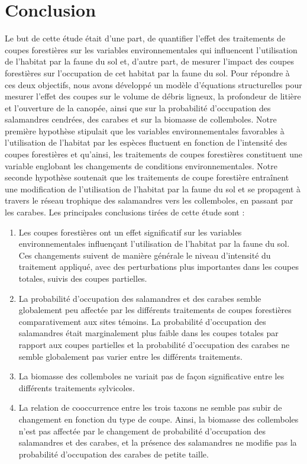 \chapter*{Conclusion}           %
\label{chap-conclusion}         %


Le but de cette étude était d'une part, de quantifier l'effet des traitements de coupes forestières sur les variables environnementales qui influencent 
l'utilisation de l'habitat par la faune du sol et, d'autre part, de mesurer l'impact des coupes forestières sur l'occupation de cet habitat par la faune du sol. 
Pour répondre à ces deux objectifs, nous avons développé un modèle d'équations structurelles pour mesurer l'effet des coupes sur le volume de débris ligneux, 
la profondeur de litière et l'ouverture de la canopée, ainsi que sur la probabilité d'occupation des salamandres cendrées, des carabes et sur la biomasse de collemboles.
Notre première hypothèse stipulait que les variables environnementales favorables à l'utilisation de l'habitat par les espèces fluctuent 
en fonction de l'intensité des coupes forestières et qu'ainsi, les traitements de coupes forestières constituent une variable englobant les changements de conditions environnementales. 
Notre seconde hypothèse soutenait que les traitements de coupe forestière entraînent une modification de l'utilisation de l'habitat par la faune du sol et se propagent à travers 
le réseau trophique des salamandres vers les collemboles, en passant par les carabes. 
Les principales conclusions tirées de cette étude sont :

\begin{enumerate}
  \item Les coupes forestières ont un effet significatif sur les variables environnementales influençant l'utilisation de l'habitat par la faune du sol. Ces changements suivent de manière générale le niveau d'intensité du traitement appliqué, avec des perturbations plus importantes dans les coupes totales, suivis des coupes partielles.
  \item La probabilité d’occupation des salamandres et des carabes semble globalement peu affectée par les différents traitements de coupes forestières comparativement aux sites témoins. La probabilité d’occupation des salamandres était marginalement plus faible dans les coupes totales par rapport aux coupes partielles et la probabilité d’occupation des carabes ne semble globalement pas varier entre les différents traitements. 
  \item La biomasse des collemboles ne variait pas de façon significative entre les différents traitements sylvicoles.
  \item La relation de cooccurrence entre les trois taxons ne semble pas subir de changement en fonction du type de coupe. Ainsi, la biomasse des collemboles n'est pas affectée par le changement de probabilité d'occupation des salamandres et des carabes, et la présence des salamandres ne modifie pas la probabilité d'occupation des carabes de petite taille.
\end{enumerate}

